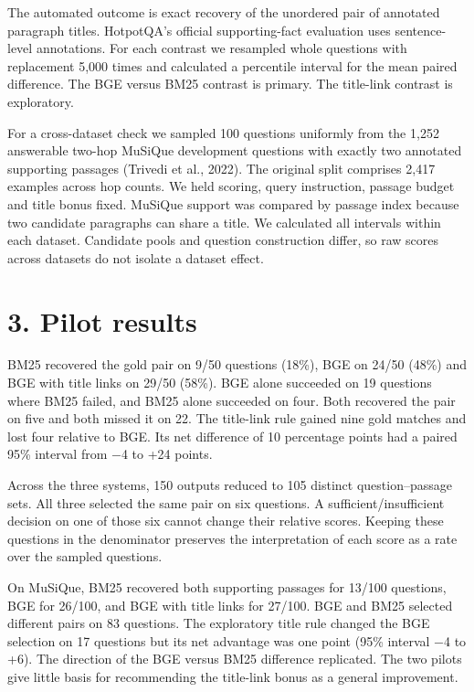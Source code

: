 \documentclass[11pt]{article}
\begin{document}
The automated outcome is exact recovery of the unordered pair of annotated paragraph titles. HotpotQA's official supporting-fact evaluation uses sentence-level annotations. For each contrast we resampled whole questions with replacement 5,000 times and calculated a percentile interval for the mean paired difference. The BGE versus BM25 contrast is primary. The title-link contrast is exploratory.

For a cross-dataset check we sampled 100 questions uniformly from the 1,252 answerable two-hop MuSiQue development questions with exactly two annotated supporting passages (Trivedi et al., 2022). The original split comprises 2,417 examples across hop counts. We held scoring, query instruction, passage budget and title bonus fixed. MuSiQue support was compared by passage index because two candidate paragraphs can share a title. We calculated all intervals within each dataset. Candidate pools and question construction differ, so raw scores across datasets do not isolate a dataset effect.

\section*{3. Pilot results}
BM25 recovered the gold pair on 9/50 questions (18\%), BGE on 24/50 (48\%) and BGE with title links on 29/50 (58\%). BGE alone succeeded on 19 questions where BM25 failed, and BM25 alone succeeded on four. Both recovered the pair on five and both missed it on 22. The title-link rule gained nine gold matches and lost four relative to BGE. Its net difference of 10 percentage points had a paired 95\% interval from $-$4 to +24 points.

Across the three systems, 150 outputs reduced to 105 distinct question--passage sets. All three selected the same pair on six questions. A sufficient/insufficient decision on one of those six cannot change their relative scores. Keeping these questions in the denominator preserves the interpretation of each score as a rate over the sampled questions.

On MuSiQue, BM25 recovered both supporting passages for 13/100 questions, BGE for 26/100, and BGE with title links for 27/100. BGE and BM25 selected different pairs on 83 questions. The exploratory title rule changed the BGE selection on 17 questions but its net advantage was one point (95\% interval $-$4 to +6). The direction of the BGE versus BM25 difference replicated. The two pilots give little basis for recommending the title-link bonus as a general improvement.
\end{document}
